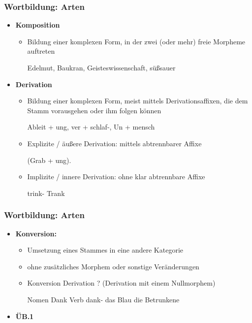 \begin{frame}
\frametitle{Wortbildung: Arten}

\begin{itemize}
	\item \textbf{Komposition}
	
	\begin{itemize}
		\item Bildung einer komplexen Form, in der zwei (oder mehr) freie Morpheme auftreten
		
		\ea Edelmut, Baukran, Geisteswissenschaft, süßsauer
		\z
		
	\end{itemize}
	
	\item \textbf{Derivation}
	
	\begin{itemize}
		\item Bildung einer komplexen Form, meist mittels Derivationsaffixen, die dem Stamm vorausgehen oder ihm folgen können
		
		\ea Ableit + ung, ver + schlaf-, Un + mensch
		\z
		
		\item Explizite / äußere Derivation: mittels abtrennbarer Affixe
		
		\ea (Grab + ung).
		\z
		
		\item Implizite / innere Derivation: ohne klar abtrennbare Affixe
		
		\ea trink- \vs Trank
		\z
		
	\end{itemize}
\end{itemize}


\end{frame}


\begin{frame}
\frametitle{Wortbildung: Arten}

\begin{itemize}
	\item \textbf{Konversion:}
	
	\begin{itemize}
		\item Umsetzung eines Stammes in eine andere Kategorie
		\item ohne zusätzliches Morphem oder sonstige Veränderungen
		\item Konversion \ras Derivation ? (Derivation mit einem Nullmorphem)
		
		\eal 
			\ex Nomen Dank \vs Verb dank-
			\ex das Blau
			\ex die Betrunkene
		\zl
			 
	\end{itemize}
	
	\item[] \textbf{ÜB.1}
\end{itemize}


\end{frame}


